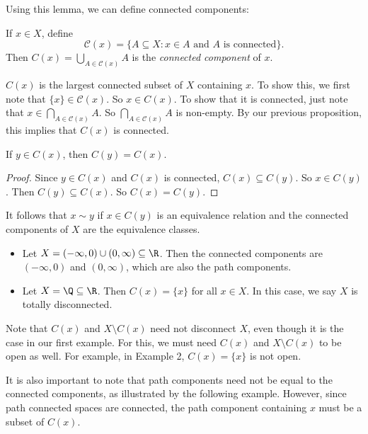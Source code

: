 \documentclass[a4paper]{article}
\begin{document}
Using this lemma, we can define connected components:

\begin{defi}
  If $x\in X$, define
  \[
    \mathcal{C}(x) = \{A\subseteq X: x\in A\text{ and }A\text{ is connected}\}.
  \]
  Then $\displaystyle C(x) = \bigcup_{A\in \mathcal{C}(x)} A$ is the \emph{connected component} of $x$.
\end{defi}
$C(x)$ is the largest connected subset of $X$ containing $x$. To show this, we first note that $\{x\}\in \mathcal{C}(x)$. So $x\in C(x)$. To show that it is connected, just note that $x\in \bigcap_{A\in \mathcal{C}(x)}A$. So $\bigcap_{A\in \mathcal{C}(x)}A$ is non-empty. By our previous proposition, this implies that $C(x)$ is connected.

\begin{lemma}
  If $y\in C(x)$, then $C(y) = C(x)$.
\end{lemma}

\begin{proof}
  Since $y\in C(x)$ and $C(x)$ is connected, $C(x) \subseteq C(y)$. So $x\in C(y)$. Then $C(y)\subseteq C(x)$. So $C(x) = C(y)$.
\end{proof}

It follows that $x\sim y$ if $x \in C(y)$ is an equivalence relation and the connected components of $X$ are the equivalence classes.

\begin{eg}\leavevmode
  \begin{itemize}
    \item Let $X = (-\infty, 0) \cup (0, \infty)\subseteq \R$. Then the connected components are $(-\infty, 0)$ and $(0, \infty)$, which are also the path components.
    \item Let $X = \Q\subseteq \R$. Then $C(x) = \{x\}$ for all $x\in X$. In this case, we say $X$ is totally disconnected.
  \end{itemize}
\end{eg}
Note that $C(x)$ and $X\setminus C(x)$ need not disconnect $X$, even though it is the case in our first example. For this, we must need $C(x)$ and $X\setminus C(x)$ to be open as well. For example, in Example 2, $C(x) = \{x\}$ is not open.

It is also important to note that path components need not be equal to the connected components, as illustrated by the following example. However, since path connected spaces are connected, the path component containing $x$ must be a subset of $C(x)$.
\end{document}
